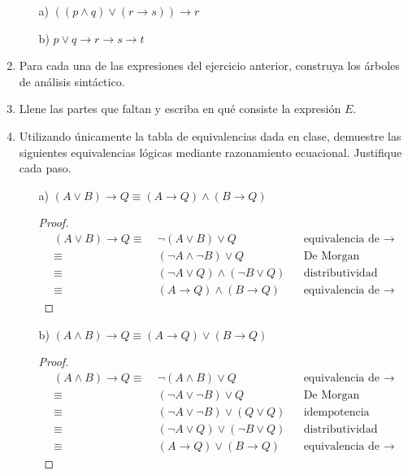 \documentclass[letterpaper,11pt]{article}
\begin{document}
\begin{enumerate}
    \begin{itemize}
        \item[a)] $((p \land q) \lor (r → s)) → r$
        \item[b)] $p \lor q → r → s → t$
    \end{itemize}

    \item Para cada una de las expresiones del ejercicio anterior, construya
    los árboles de análisis sintáctico.

    \item Llene las partes que faltan y escriba en qué consiste la expresión 
    $E$.

    \item Utilizando únicamente la tabla de equivalencias dada en clase, 
    demuestre las siguientes equivalencias lógicas mediante razonamiento 
    ecuacional. Justifique cada paso.

    \begin{itemize}
        \item[a)] $(A \lor B) → Q ≡ (A → Q) \land (B → Q)$ 
        \begin{proof}
            \begin{align*}
                (A \lor B) → Q 
                ≡& \; \neg (A \lor B) \lor Q  
                && \text{equivalencia de $→$} \\
                ≡& \; (\neg A \land \neg B) \lor Q 
                && \text{De Morgan} \\ 
                ≡& \; (\neg A \lor Q) \land (\neg B \lor Q)
                && \text{distributividad} \\ 
                ≡& \; (A → Q) \land (B → Q)
                && \text{equivalencia de $→$} 
            \end{align*}
        \end{proof}

        \item[b)] $(A \land B) → Q ≡ (A → Q) \lor (B → Q)$ 
        \begin{proof}
            \begin{align*}
                (A \land B) → Q 
                ≡& \; \neg (A \land B) \lor Q
                && \text{equivalencia de $→$} \\ 
                ≡& \; (\neg A \lor \neg B) \lor Q
                && \text{De Morgan} \\
                ≡& \; (\neg A \lor \neg B) \lor (Q \lor Q)
                && \text{idempotencia} \\ 
                ≡& \; (\neg A \lor Q) \lor (\neg B \lor Q)
                && \text{distributividad} \\
                ≡& \; (A → Q) \lor (B → Q)
                && \text{equivalencia de $→$}
            \end{align*}
        \end{proof}


\end{itemize}
\end{enumerate}
\end{document}
